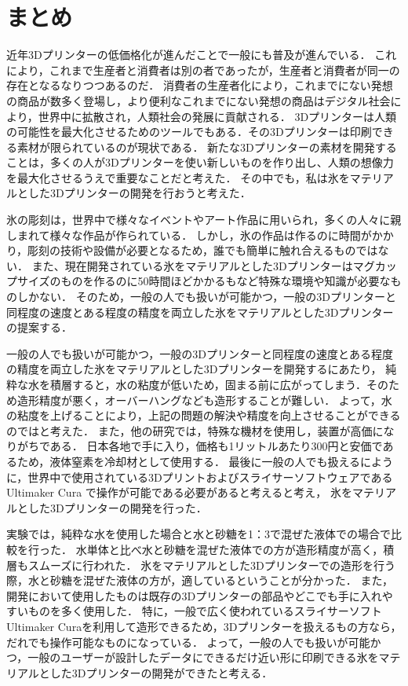 \chapter{まとめ}
\label{chp:first}

近年3Dプリンターの低価格化が進んだことで一般にも普及が進んでいる．
これにより，これまで生産者と消費者は別の者であったが，生産者と消費者が同一の存在となるなりつつあるのだ．
消費者の生産者化により，これまでにない発想の商品が数多く登場し，より便利なこれまでにない発想の商品はデジタル社会により，世界中に拡散され，人類社会の発展に貢献される．
3Dプリンターは人類の可能性を最大化させるためのツールでもある．その3Dプリンターは印刷できる素材が限られているのが現状である．
新たな3Dプリンターの素材を開発することは，多くの人が3Dプリンターを使い新しいものを作り出し、人類の想像力を最大化させるうえで重要なことだと考えた．
その中でも，私は氷をマテリアルとした3Dプリンターの開発を行おうと考えた．

氷の彫刻は，世界中で様々なイベントやアート作品に用いられ，多くの人々に親しまれて様々な作品が作られている．
しかし，氷の作品は作るのに時間がかかり，彫刻の技術や設備が必要となるため，誰でも簡単に触れ合えるものではない．
また、現在開発されている氷をマテリアルとした3Dプリンターはマグカップサイズのものを作るのに50時間ほどかかるもなど特殊な環境や知識が必要なものしかない．
そのため，一般の人でも扱いが可能かつ，一般の3Dプリンターと同程度の速度とある程度の精度を両立した氷をマテリアルとした3Dプリンターの提案する．

一般の人でも扱いが可能かつ，一般の3Dプリンターと同程度の速度とある程度の精度を両立した氷をマテリアルとした3Dプリンターを開発するにあたり，
純粋な水を積層すると，水の粘度が低いため，固まる前に広がってしまう．そのため造形精度が悪く，オーバーハングなども造形することが難しい．
よって，水の粘度を上げることにより，上記の問題の解決や精度を向上させることができるのではと考えた．
また，他の研究では，特殊な機材を使用し，装置が高価になりがちである．
日本各地で手に入り，価格も1リットルあたり300円と安価であるため，液体窒素を冷却材として使用する．
最後に一般の人でも扱えるにように，世界中で使用されている3Dプリントおよびスライサーソフトウェアである Ultimaker Cura で操作が可能である必要があると考えると考え，
氷をマテリアルとした3Dプリンターの開発を行った．

実験では，純粋な水を使用した場合と水と砂糖を1：3で混ぜた液体での場合で比較を行った．
水単体と比べ水と砂糖を混ぜた液体での方が造形精度が高く，積層もスムーズに行われた．
氷をマテリアルとした3Dプリンターでの造形を行う際，水と砂糖を混ぜた液体の方が，適しているということが分かった．
また，開発において使用したものは既存の3Dプリンターの部品やどこでも手に入れやすいものを多く使用した．
特に，一般で広く使われているスライサーソフトUltimaker Curaを利用して造形できるため，3Dプリンターを扱えるもの方なら，だれでも操作可能なものになっている．
よって，一般の人でも扱いが可能かつ，一般のユーザーが設計したデータにできるだけ近い形に印刷できる氷をマテリアルとした3Dプリンターの開発ができたと考える．

